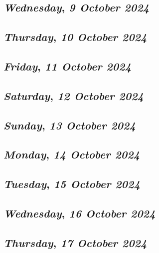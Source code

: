\def\day{\textit{9 October 2024}}
\def\weekday{\textit{Wednesday}}
\subsection*{\weekday, \day}

\def\day{\textit{10 October 2024}}
\def\weekday{\textit{Thursday}}
\subsection*{\weekday, \day}

\def\day{\textit{11 October 2024}}
\def\weekday{\textit{Friday}}
\subsection*{\weekday, \day}

\def\day{\textit{12 October 2024}}
\def\weekday{\textit{Saturday}}
\subsection*{\weekday, \day}

\def\day{\textit{13 October 2024}}
\def\weekday{\textit{Sunday}}
\subsection*{\weekday, \day}

\def\day{\textit{14 October 2024}}
\def\weekday{\textit{Monday}}
\subsection*{\weekday, \day}

\def\day{\textit{15 October 2024}}
\def\weekday{\textit{Tuesday}}
\subsection*{\weekday, \day}

\def\day{\textit{16 October 2024}}
\def\weekday{\textit{Wednesday}}
\subsection*{\weekday, \day}

\def\day{\textit{17 October 2024}}
\def\weekday{\textit{Thursday}}
\subsection*{\weekday, \day}

